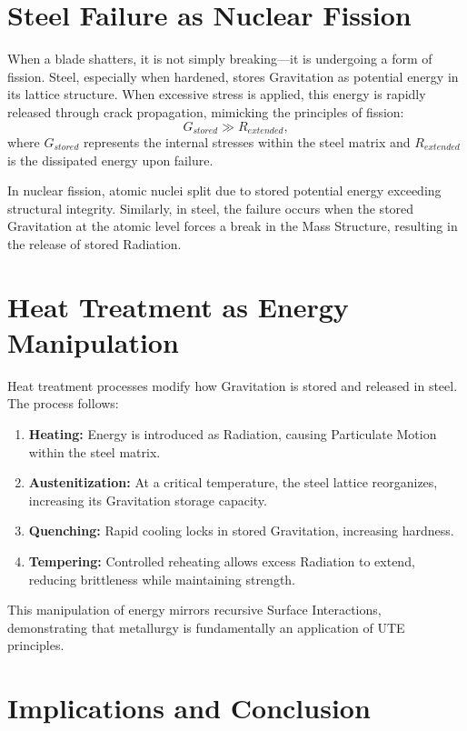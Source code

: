 \documentclass[letterpaper,12pt]{article}
\begin{document}
\section{Steel Failure as Nuclear Fission}

When a blade shatters, it is not simply breaking—it is undergoing a form of fission. Steel, especially when hardened, stores Gravitation as potential energy in its lattice structure. When excessive stress is applied, this energy is rapidly released through crack propagation, mimicking the principles of fission:
\begin{equation}
    G_{stored} \gg R_{extended},
\end{equation}
where $G_{stored}$ represents the internal stresses within the steel matrix and $R_{extended}$ is the dissipated energy upon failure.

In nuclear fission, atomic nuclei split due to stored potential energy exceeding structural integrity. Similarly, in steel, the failure occurs when the stored Gravitation at the atomic level forces a break in the Mass Structure, resulting in the release of stored Radiation.

\section{Heat Treatment as Energy Manipulation}

Heat treatment processes modify how Gravitation is stored and released in steel. The process follows:
\begin{enumerate}
    \item \textbf{Heating:} Energy is introduced as Radiation, causing Particulate Motion within the steel matrix.
    \item \textbf{Austenitization:} At a critical temperature, the steel lattice reorganizes, increasing its Gravitation storage capacity.
    \item \textbf{Quenching:} Rapid cooling locks in stored Gravitation, increasing hardness.
    \item \textbf{Tempering:} Controlled reheating allows excess Radiation to extend, reducing brittleness while maintaining strength.
\end{enumerate}

This manipulation of energy mirrors recursive Surface Interactions, demonstrating that metallurgy is fundamentally an application of UTE principles.

\section{Implications and Conclusion}
\end{document}
